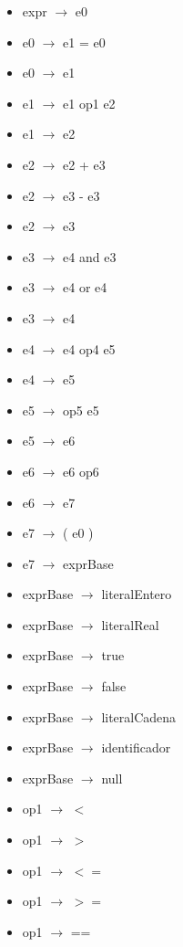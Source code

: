 \documentclass[11pt]{article}
\begin{document}
        \begin{itemize}
            \item expr $\rightarrow$ e0
            \item e0 $\rightarrow$ e1 = e0
            \item e0 $\rightarrow$ e1
            \item e1 $\rightarrow$ e1 op1 e2
            \item e1 $\rightarrow$ e2
            \item e2 $\rightarrow$ e2 + e3
            \item e2 $\rightarrow$ e3 - e3
            \item e2 $\rightarrow$ e3
            \item e3 $\rightarrow$ e4 and e3
            \item e3 $\rightarrow$ e4 or e4
            \item e3 $\rightarrow$ e4
            \item e4 $\rightarrow$ e4 op4 e5
            \item e4 $\rightarrow$ e5
            \item e5 $\rightarrow$ op5 e5
            \item e5 $\rightarrow$ e6
            \item e6 $\rightarrow$ e6 op6
            \item e6 $\rightarrow$ e7
            \item e7 $\rightarrow$ ( e0 )
            \item e7 $\rightarrow$ exprBase
            \item exprBase $\rightarrow$ literalEntero
            \item exprBase $\rightarrow$ literalReal
            \item exprBase $\rightarrow$ true
            \item exprBase $\rightarrow$ false
            \item exprBase $\rightarrow$ literalCadena
            \item exprBase $\rightarrow$ identificador
            \item exprBase $\rightarrow$ null
            \item op1 $\rightarrow$ $<$
            \item op1 $\rightarrow$ $>$
            \item op1 $\rightarrow$ $<=$
            \item op1 $\rightarrow$ $>=$
            \item op1 $\rightarrow$ ==

\end{itemize}
\end{document}
